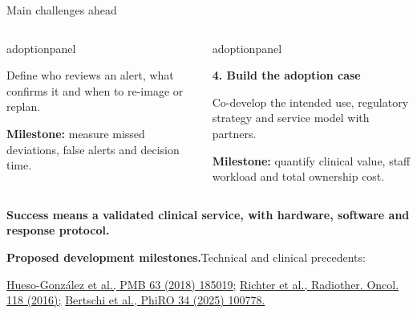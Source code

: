 \documentclass[aspectratio=169,11pt]{beamer}
\begin{document}
\begin{frame}{Main challenges ahead}
\begin{columns}[T,onlytextwidth]
\begin{beamercolorbox}[sep=6pt,wd=\linewidth]{adoptionpanel}
\begin{minipage}[t][1.65cm][t]{\linewidth}
\vspace{0.07cm}
{\scriptsize Define who reviews an alert, what confirms it and when to re-image or replan.\par\vspace{0.08cm}\textbf{Milestone:} measure missed deviations, false alerts and decision time.\par}
\end{minipage}
\end{beamercolorbox}
\begin{beamercolorbox}[sep=6pt,wd=\linewidth]{adoptionpanel}
\begin{minipage}[t][1.65cm][t]{\linewidth}\raggedright
{\footnotesize\bfseries\color{crBlue}4. Build the adoption case\par}
\vspace{0.07cm}
{\scriptsize Co-develop the intended use, regulatory strategy and service model with partners.\par\vspace{0.08cm}\textbf{Milestone:} quantify clinical value, staff workload and total ownership cost.\par}
\end{minipage}
\end{beamercolorbox}
\end{columns}

\vspace{0.16cm}
{\footnotesize\bfseries\color{darkred}
Success means a validated clinical service, with hardware, software and response protocol.\par}
\vfill
{\fontsize{6}{7}\selectfont\color{crGrey}\raggedright
\textbf{Proposed development milestones.}\quad Technical and clinical precedents:\par
\href{https://doi.org/10.1088/1361-6560/aad513}
{Hueso-Gonz\'alez et al., PMB 63 (2018) 185019;}\quad
\href{https://doi.org/10.1016/j.radonc.2016.01.004}
{Richter et al., Radiother. Oncol. 118 (2016);}\quad
\href{https://doi.org/10.1016/j.phro.2025.100778}
{Bertschi et al., PhiRO 34 (2025) 100778.}\par
}
\end{frame}
\end{document}
